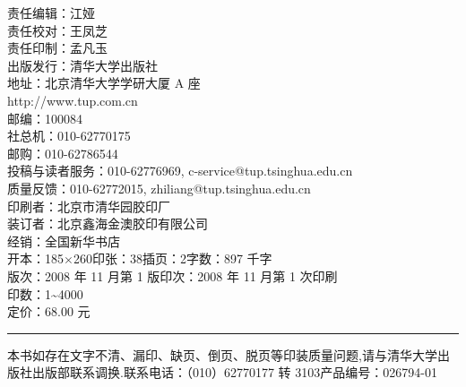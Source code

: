 {\vspace{8pt}
\noindent 责任编辑：江\quad 娅\\
责任校对：王凤芝\\
责任印制：孟凡玉\\
出版发行：清华大学出版社\\
\hspace{4em}地\quad 址：北京清华大学学研大厦 A 座\\
\hspace{4em}http://www.tup.com.cn\\
\hspace{4em}邮\quad 编：100084\\
\hspace{4em}社\quad 总\quad 机：010-62770175\\
\hspace{4em}邮\quad 购：010-62786544\\
\hspace{4em}投稿与读者服务：010-62776969, c-service@tup.tsinghua.edu.cn\\
\hspace{4em}质\quad 量\quad 反\quad 馈：010-62772015, zhiliang@tup.tsinghua.edu.cn\\
印\quad 刷\quad 者：北京市清华园胶印厂\\
装\quad 订\quad 者：北京鑫海金澳胶印有限公司\\
经\quad\quad\quad 销：全国新华书店\\
开\quad\quad\quad 本：185$\times$260\quad 印\quad 张：38\quad 插\quad 页：2\quad 字\quad 数：897 千字\\
版\quad\quad\quad 次：2008 年 11 月第 1 版\quad 印\quad 次：2008 年 11 月第 1 次印刷\\
印\quad\quad\quad 数：1\~{}4000\\
定\quad\quad\quad 价：68.00 元

\vspace{8pt}
\noindent\rule{\linewidth}{0.4pt}

\vspace{3pt}
\noindent 本书如存在文字不清、漏印、缺页、倒页、脱页等印装质量问题,请与清华大学出版社出版部联系调换.联系电话：（010）62770177 转 3103\quad 产品编号：026794-01
}

\clearpage
{}
\setcounter{page}{1}



